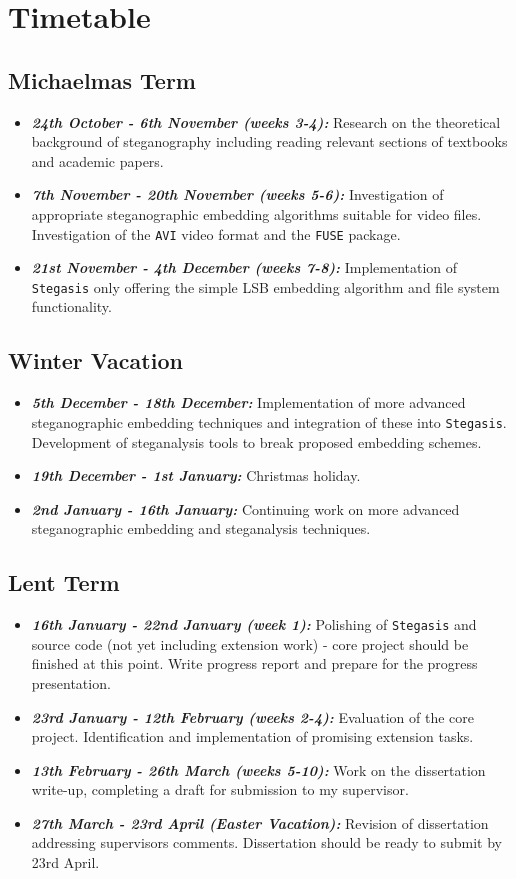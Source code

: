 \documentclass[paper=a4, fontsize=11pt,twoside]{scrartcl}
\numberwithin{table}{section}
\numberwithin{figure}{section}
\numberwithin{algorithm}{section}
\begin{document}
\section*{Timetable}
\subsection*{Michaelmas Term}
\begin{itemize}
\item \textbf{\textit{24th October - 6th November (weeks 3-4):}} Research on the theoretical background of steganography including reading relevant sections of textbooks and academic papers.
\item \textbf{\textit{7th November - 20th November (weeks 5-6):}} Investigation of appropriate steganographic embedding algorithms suitable for video files. Investigation of the \texttt{AVI} video format and the \texttt{FUSE} package.
\item \textbf{\textit{21st November - 4th December (weeks 7-8):}} Implementation of \texttt{Stegasis} only offering the simple LSB embedding algorithm and file system functionality.
\end{itemize}

\subsection*{Winter Vacation}
\begin{itemize}
\item \textbf{\textit{5th December - 18th December:}} Implementation of more advanced steganographic embedding techniques and integration of these into \texttt{Stegasis}. Development of steganalysis tools to break proposed embedding schemes.
\item \textbf{\textit{19th December - 1st January:}} Christmas holiday.
\item \textbf{\textit{2nd January - 16th January:}} Continuing work on more advanced steganographic embedding and steganalysis techniques.
\end{itemize}

\subsection*{Lent Term}
\begin{itemize}
\item \textbf{\textit{16th January - 22nd January (week 1):}} Polishing of \texttt{Stegasis} and source code (not yet including extension work) - core project should be finished at this point. Write progress report and prepare for the progress presentation.
\item \textbf{\textit{23rd January - 12th February (weeks 2-4):}} Evaluation of the core project. Identification and implementation of promising extension tasks.
\item \textbf{\textit{13th February - 26th March (weeks 5-10):}} Work on the dissertation write-up, completing a draft for submission to my supervisor.
\item \textbf{\textit{27th March -  23rd April (Easter Vacation):}} Revision of dissertation addressing supervisors comments. Dissertation should be ready to submit by 23rd April.
\end{itemize}
\end{document}

